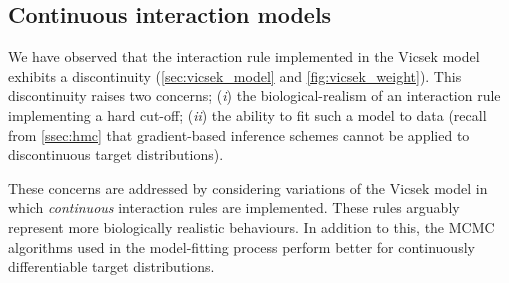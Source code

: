 \subsection{Continuous interaction models}
\label{ssec:cont_models}

We have observed that the interaction rule implemented in the Vicsek model
exhibits a discontinuity (\cref{sec:vicsek_model} and
\cref{fig:vicsek_weight}). This discontinuity raises two concerns; (\emph{i})
the biological-realism of an interaction rule implementing a hard cut-off;
(\emph{ii}) the ability to fit such a model to data (recall from
\cref{ssec:hmc} that gradient-based inference schemes cannot be applied to
discontinuous target distributions).

These concerns are addressed by considering variations of the Vicsek model in
which \emph{continuous} interaction rules are implemented. These rules arguably
represent more biologically realistic behaviours. In addition to this, the MCMC
algorithms used in the model-fitting process perform better for continuously
differentiable target distributions.

